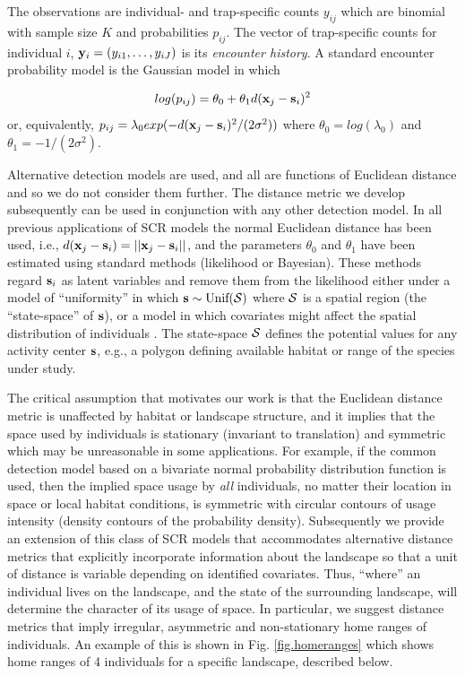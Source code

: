 \documentclass[12pt]{article}
\begin{document}
\begin{spacing}{1.8}
The observations are individual- and trap-specific counts $y_{ij}$
which are binomial with sample size $K$ and probabilities
$p_{ij}$. The vector of trap-specific counts for individual $i$,
 ${\bf y}_{i} = (y_{i1},\ldots,y_{iJ})$ is its {\it encounter history}.
A standard encounter probability model
\citep{borchers_efford:2008} is the Gaussian model in which

\begin{equation}
log(p_{ij})= \theta_{0} + \theta_{1} d({\bf x}_{j} - {\bf s}_{i})^{2}
\label{eq.encounter}
\end{equation}
or, equivalently, 
$p_{ij} = \lambda_{0} exp(-  d({\bf x}_{j} - {\bf s}_{i})^{2}
/(2\sigma^{2}) )$
where $\theta_{0} = log(\lambda_{0})$ and $\theta_{1} =
-1/(2\sigma^2)$.


Alternative detection models are used, and all are
functions of Euclidean distance and so we do not consider them
further. The distance metric we develop subsequently can be
used in conjunction with any other detection model.  In all previous
applications of SCR models the normal Euclidean distance has been
used, i.e., $ d({\bf x}_{j} - {\bf s}_{i}) = ||{\bf x}_{j} - {\bf
  s}_{i}||$, and the parameters $\theta_0$ and $\theta_1$ have been
estimated using standard methods (likelihood or Bayesian). These
methods regard ${\bf s}_{i}$ as latent variables
and remove them from the likelihood either under a
model of ``uniformity'' in which ${\bf s} \sim \mbox{Unif}({\cal
  S})$ where ${\cal S}$ is a spatial region (the ``state-space'' of
${\bf s}$), or a 
model in which covariates might affect the spatial distribution of
individuals \citep{borchers_efford:2008}. The state-space ${\cal S}$
defines the potential values for any activity center ${\bf s}$, e.g., 
a polygon defining available habitat or range of the species under study.

The critical assumption that motivates our work is that the Euclidean
distance metric is unaffected by habitat or landscape structure, and
it implies that the space used by individuals is stationary (invariant
to translation) and symmetric
which may be unreasonable in some applications.  For example, if the
common detection model based on a bivariate normal probability
distribution function is used, then the implied space usage by {\it
  all} individuals, no matter their location in space or local habitat
conditions, is symmetric with circular contours of usage intensity
(density contours of the probability density).  Subsequently we provide an extension
of this class of SCR models that accommodates alternative distance
metrics that explicitly incorporate information about the landscape so
that a unit of distance is variable depending on identified
covariates. Thus, ``where'' an individual lives on the landscape, and
the state of the surrounding landscape, will determine the character
of its usage of space. In particular, we suggest distance metrics that
imply irregular, asymmetric and non-stationary home ranges of
individuals. An example of this is shown in Fig. \ref{fig.homeranges}
which shows home ranges of 4 individuals for a specific landscape, 
described below.




\end{spacing}
\end{document}
